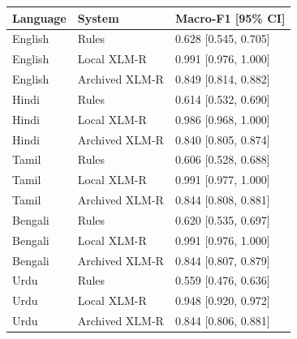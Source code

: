 \begin{tabular}{lll}
\toprule
Language & System & Macro-F1 [95\% CI] \\
\midrule
English & Rules & 0.628 [0.545, 0.705] \\
English & Local XLM-R & 0.991 [0.976, 1.000] \\
English & Archived XLM-R & 0.849 [0.814, 0.882] \\
Hindi & Rules & 0.614 [0.532, 0.690] \\
Hindi & Local XLM-R & 0.986 [0.968, 1.000] \\
Hindi & Archived XLM-R & 0.840 [0.805, 0.874] \\
Tamil & Rules & 0.606 [0.528, 0.688] \\
Tamil & Local XLM-R & 0.991 [0.977, 1.000] \\
Tamil & Archived XLM-R & 0.844 [0.808, 0.881] \\
Bengali & Rules & 0.620 [0.535, 0.697] \\
Bengali & Local XLM-R & 0.991 [0.976, 1.000] \\
Bengali & Archived XLM-R & 0.844 [0.807, 0.879] \\
Urdu & Rules & 0.559 [0.476, 0.636] \\
Urdu & Local XLM-R & 0.948 [0.920, 0.972] \\
Urdu & Archived XLM-R & 0.844 [0.806, 0.881] \\
\bottomrule
\end{tabular}
